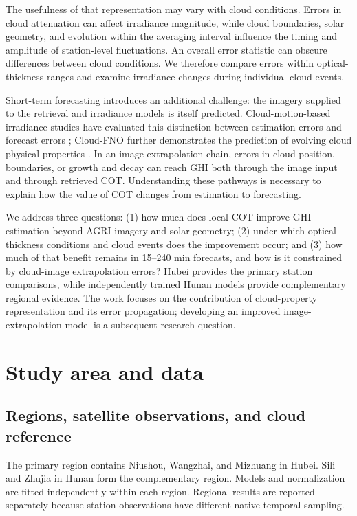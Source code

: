 \documentclass[11pt]{article}
\begin{document}
The usefulness of that representation may vary with cloud conditions. Errors in cloud attenuation can affect irradiance magnitude, while cloud boundaries, solar geometry, and evolution within the averaging interval influence the timing and amplitude of station-level fluctuations. An overall error statistic can obscure differences between cloud conditions. We therefore compare errors within optical-thickness ranges and examine irradiance changes during individual cloud events.

Short-term forecasting introduces an additional challenge: the imagery supplied to the retrieval and irradiance models is itself predicted. Cloud-motion-based irradiance studies have evaluated this distinction between estimation errors and forecast errors \cite{pap2024}; Cloud-FNO further demonstrates the prediction of evolving cloud physical properties \cite{zhang2026}. In an image-extrapolation chain, errors in cloud position, boundaries, or growth and decay can reach GHI both through the image input and through retrieved COT. Understanding these pathways is necessary to explain how the value of COT changes from estimation to forecasting.

We address three questions: (1) how much does local COT improve GHI estimation beyond AGRI imagery and solar geometry; (2) under which optical-thickness conditions and cloud events does the improvement occur; and (3) how much of that benefit remains in 15--240 min forecasts, and how is it constrained by cloud-image extrapolation errors? Hubei provides the primary station comparisons, while independently trained Hunan models provide complementary regional evidence. The work focuses on the contribution of cloud-property representation and its error propagation; developing an improved image-extrapolation model is a subsequent research question.

\section{Study area and data}
\subsection{Regions, satellite observations, and cloud reference}
The primary region contains Niushou, Wangzhai, and Mizhuang in Hubei. Sili and Zhujia in Hunan form the complementary region. Models and normalization are fitted independently within each region. Regional results are reported separately because station observations have different native temporal sampling.
\end{document}
